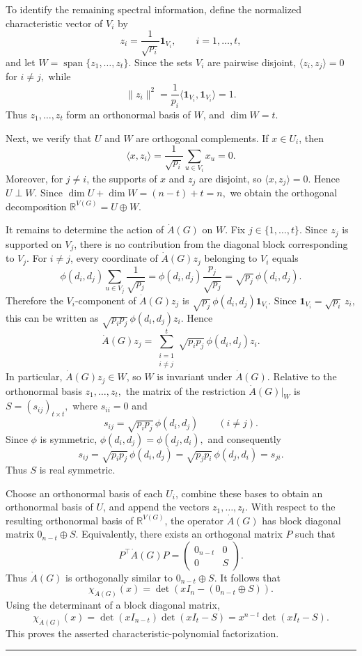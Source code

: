 \documentclass[12pt,twoside]{article}
\renewenvironment{proof}{{\noindent\bfseries Proof.}}{\qed}
\def\qed{\nolinebreak\hfill\rule{.2cm}{.2cm}\par\addvspace{.5cm}}
\begin{document}
\begin{proof}
	To identify the remaining spectral information, define the normalized characteristic vector of $V_i$ by
	$$
	z_i
	=
	\frac{1}{\sqrt{p_i}}\mathbf 1_{V_i},
	\qquad i=1,\ldots,t,
	$$
	and let
	$
	W=\operatorname{span}\{z_1,\ldots,z_t\}.
	$
	Since the sets $V_i$ are pairwise disjoint,
	$
	\langle z_i,z_j\rangle=0$ for $i\neq j,$
	while
	$$
	\|z_i\|^2
	=
	\frac{1}{p_i}\langle\mathbf 1_{V_i},\mathbf 1_{V_i}\rangle
	=
	1.
	$$
	Thus
	$
	z_1,\ldots,z_t
	$
	form an orthonormal basis of $W$, and
	$
	\dim W=t.
	$
	
	Next, we verify that $U$ and $W$ are orthogonal complements. If $x\in U_i$, then
	$$
	\langle x,z_i\rangle
	=
	\frac{1}{\sqrt{p_i}}
	\sum_{u\in V_i}x_u
	=
	0.
	$$
	Moreover, for $j\neq i$, the supports of $x$ and $z_j$ are disjoint, so
	$
	\langle x,z_j\rangle=0.
	$
	Hence
	$
	U\perp W.
	$
	Since
	$
	\dim U+\dim W=(n-t)+t=n,
	$
	we obtain the orthogonal decomposition
	$
	\mathbb R^{V(G)}=U\oplus W.
	$
	
	It remains to determine the action of $\dot A(G)$ on $W$. Fix $j\in\{1,\ldots,t\}$. Since $z_j$ is supported on $V_j$, there is no contribution from the diagonal block corresponding to $V_j$. For $i\neq j$, every coordinate of $\dot A(G)z_j$ belonging to $V_i$ equals
	$$
	\phi(d_i,d_j)
	\sum_{u\in V_j}\frac{1}{\sqrt{p_j}}
	=
	\phi(d_i,d_j)\frac{p_j}{\sqrt{p_j}}
	=
	\sqrt{p_j}\,\phi(d_i,d_j).
	$$
	Therefore the $V_i$-component of $\dot A(G)z_j$ is
	$
	\sqrt{p_j}\,\phi(d_i,d_j)\mathbf 1_{V_i}.
	$
	Since
	$
	\mathbf 1_{V_i}=\sqrt{p_i}\,z_i,
	$
	this can be written as
	$
	\sqrt{p_ip_j}\,\phi(d_i,d_j)z_i.
	$
	Hence
	$$
	\dot A(G)z_j
	=
	\sum_{\substack{i=1\\i\neq j}}^t
	\sqrt{p_ip_j}\,\phi(d_i,d_j)z_i.
	$$
	In particular, $\dot A(G)z_j\in W$, so $W$ is invariant under $\dot A(G)$.
	 Relative to the orthonormal basis
	$
	z_1,\ldots,z_t,
	$
	the matrix of the restriction $\dot A(G)|_W$ is 
	$
	S=(s_{ij})_{t\times t},
	$
	where
	$
	s_{ii}=0
	$
	and
	$$
	s_{ij}
	=
	\sqrt{p_ip_j}\,\phi(d_i,d_j)
	\qquad(i\neq j).
	$$
	Since $\phi$ is symmetric,
	$
	\phi(d_i,d_j)=\phi(d_j,d_i),
	$
	and consequently
	$$
	s_{ij}
	=
	\sqrt{p_ip_j}\,\phi(d_i,d_j)
	=
	\sqrt{p_jp_i}\,\phi(d_j,d_i)
	=
	s_{ji}.
	$$
	Thus $S$ is real symmetric.
	
	Choose an orthonormal basis of each $U_i$, combine these bases to obtain an orthonormal basis of $U$, and append the vectors
	$
	z_1,\ldots,z_t.
	$
	With respect to the resulting orthonormal basis of $\mathbb R^{V(G)}$, the operator $\dot A(G)$ has block diagonal matrix
	$
	0_{n-t}\oplus S.
	$
	Equivalently, there exists an orthogonal matrix $P$ such that
	$$
	P^{\top}\dot A(G)P
	=
	\begin{pmatrix}
		0_{n-t}&0\\
		0&S
	\end{pmatrix}.
	$$
	Thus $\dot A(G)$ is orthogonally similar to $0_{n-t}\oplus S$. It follows that
	$$
	\chi_{\dot A(G)}(x)
	=
	\det\left(xI_n-(0_{n-t}\oplus S)\right).
	$$
	Using the determinant of a block diagonal matrix,
	$$
	\chi_{\dot A(G)}(x)
	=
	\det(xI_{n-t})\det(xI_t-S)
	=
	x^{n-t}\det(xI_t-S).
	$$
	This proves the asserted characteristic-polynomial factorization.
	

\end{proof}
\end{document}
